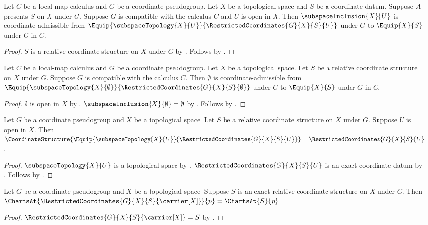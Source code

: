 \begin{theorem}\label{restricted_inclusion_consumer}
    Let $C$ be a local-map calculus and $G$ be a coordinate pseudogroup.
    Let $X$ be a topological space and $S$ be a coordinate datum.
    Suppose $A$ presents $S$ on $X$ under $G$.
    Suppose $G$ is compatible with the calculus $C$ and $U$ is open in $X$.
    Then $\subspaceInclusion{X}{U}$ is coordinate-admissible from
        $\Equip{\subspaceTopology{X}{U}}{\RestrictedCoordinates{G}{X}{S}{U}}$ under $G$
        to $\Equip{X}{S}$ under $G$ in $C$.
\end{theorem}
\begin{proof}
    $S$ is a relative coordinate structure on $X$ under $G$ by .
    Follows by .
\end{proof}

\begin{theorem}\label{empty_restricted_inclusion_consumer}
    Let $C$ be a local-map calculus and $G$ be a coordinate pseudogroup.
    Let $X$ be a topological space.
    Let $S$ be a relative coordinate structure on $X$ under $G$.
    Suppose $G$ is compatible with the calculus $C$.
    Then $\emptyset$ is coordinate-admissible from
        $\Equip{\subspaceTopology{X}{\emptyset}}{\RestrictedCoordinates{G}{X}{S}{\emptyset}}$ under $G$
        to $\Equip{X}{S}$ under $G$ in $C$.
\end{theorem}
\begin{proof}
    $\emptyset$ is open in $X$ by .
    $\subspaceInclusion{X}{\emptyset}=\emptyset$ by
        .
    Follows by .
\end{proof}

\begin{theorem}\label{restricted_equipped_extraction_consumer}
    Let $G$ be a coordinate pseudogroup and $X$ be a topological space.
    Let $S$ be a relative coordinate structure on $X$ under $G$.
    Suppose $U$ is open in $X$.
    Then $\CoordinateStructure{\Equip{\subspaceTopology{X}{U}}{\RestrictedCoordinates{G}{X}{S}{U}}}
        =\RestrictedCoordinates{G}{X}{S}{U}$.
\end{theorem}
\begin{proof}
    $\subspaceTopology{X}{U}$ is a topological space by .
    $\RestrictedCoordinates{G}{X}{S}{U}$ is an exact coordinate datum by
        .
    Follows by .
\end{proof}

\begin{theorem}\label{full_restricted_charts_consumer}
    Let $G$ be a coordinate pseudogroup and $X$ be a topological space.
    Suppose $S$ is an exact relative coordinate structure on $X$ under $G$.
    Then $\ChartsAt{\RestrictedCoordinates{G}{X}{S}{\carrier[X]}}{p}=\ChartsAt{S}{p}$.
\end{theorem}
\begin{proof}
    $\RestrictedCoordinates{G}{X}{S}{\carrier[X]}=S$ by .
\end{proof}

